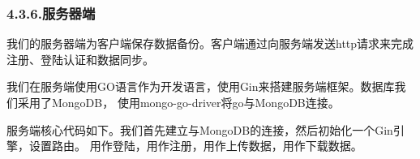 \documentclass{article}
\begin{document}
\subsubsection{4.3.6.\hspace*{0.5em}服务器端}\label{section}%

\noindent{}我们的服务器端为客户端保存数据备份。客户端通过向服务端发送http请求来完成注册、登陆认证和数据同步。%

我们在服务端使用GO语言作为开发语言，使用Gin来搭建服务端框架。数据库我们采用了MongoDB，
使用mongo-go-driver将go与MongoDB连接。%

服务端核心代码如下。我们首先建立与MongoDB的连接，然后初始化一个Gin引擎，设置路由。
用作登陆，用作注册，用作上传数据，用作下载数据。%
\end{document}
